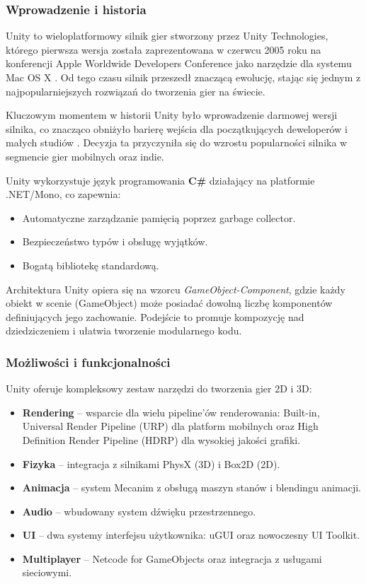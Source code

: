 \subsubsection{Wprowadzenie i historia}

Unity to wieloplatformowy silnik gier stworzony przez Unity
Technologies, którego pierwsza wersja została zaprezentowana
w czerwcu 2005 roku na konferencji Apple Worldwide Developers Conference
jako narzędzie dla systemu Mac OS X \cite{unity_wikipedia}.
Od tego czasu silnik przeszedł znaczącą ewolucję, stając się jednym
z najpopularniejszych rozwiązań do tworzenia gier na świecie.

Kluczowym momentem w historii Unity było wprowadzenie darmowej wersji
silnika, co znacząco obniżyło barierę wejścia dla początkujących
deweloperów i małych studiów \cite{unity_wikipedia}. Decyzja ta
przyczyniła się do wzrostu popularności silnika w segmencie gier
mobilnych oraz indie.

Unity wykorzystuje język programowania \textbf{C\#} działający
na platformie .NET/Mono, co zapewnia:
\begin{itemize}
    \item Automatyczne zarządzanie pamięcią poprzez garbage collector.
    \item Bezpieczeństwo typów i obsługę wyjątków.
    \item Bogatą bibliotekę standardową.
\end{itemize}

Architektura Unity opiera się na wzorcu \textit{GameObject-Component},
gdzie każdy obiekt w scenie (GameObject) może posiadać dowolną
liczbę komponentów definiujących jego zachowanie.
Podejście to promuje kompozycję nad dziedziczeniem i ułatwia
tworzenie modularnego kodu.

\subsubsection{Możliwości i funkcjonalności}

Unity oferuje kompleksowy zestaw narzędzi do tworzenia gier 2D i 3D:

\begin{itemize}
    \item \textbf{Rendering} -- wsparcie dla wielu pipeline'ów
    renderowania: Built-in, Universal Render Pipeline (URP) dla platform
    mobilnych oraz High Definition Render Pipeline (HDRP) dla wysokiej
    jakości grafiki.
    \item \textbf{Fizyka} -- integracja z silnikami PhysX (3D) i Box2D (2D).
    \item \textbf{Animacja} -- system Mecanim z obsługą maszyn stanów
    i blendingu animacji.
    \item \textbf{Audio} -- wbudowany system dźwięku przestrzennego.
    \item \textbf{UI} -- dwa systemy interfejsu użytkownika: uGUI oraz
    nowoczesny UI Toolkit.
    \item \textbf{Multiplayer} -- Netcode for GameObjects oraz
    integracja z usługami sieciowymi.
\end{itemize}

